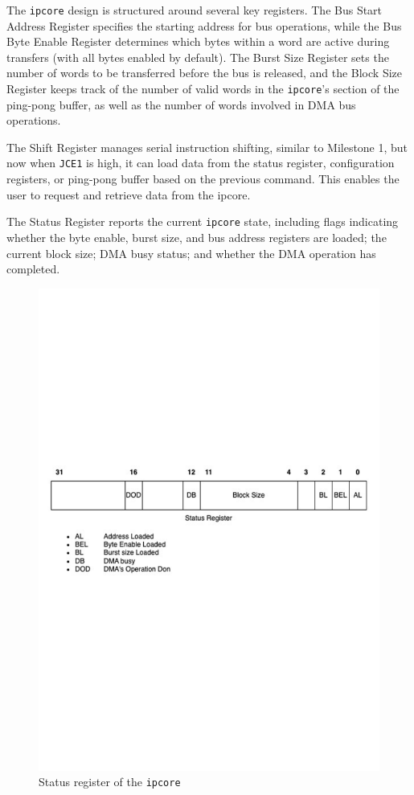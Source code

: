 \documentclass[a4paper,11pt,oneside]{report}
\begin{document}
The \texttt{ipcore} design is structured around several key registers. 
The Bus Start Address Register specifies the starting address for bus operations, 
while the Bus Byte Enable Register determines which bytes within a word are active during transfers 
(with all bytes enabled by default). 
The Burst Size Register sets the number of words to be transferred before the bus is released, 
and the Block Size Register keeps track of the number of valid words in the \texttt{ipcore}'s section of the ping-pong buffer, 
as well as the number of words involved in DMA bus operations.

The Shift Register manages serial instruction shifting, similar to Milestone 1, but now when \texttt{JCE1} is high, it can load data from the status register, configuration registers, or ping-pong buffer based on the previous command.
This enables the user to request and retrieve data from the ipcore.

The Status Register reports the current \texttt{ipcore} state, including flags indicating whether the byte enable, burst size, and bus address registers are loaded; the current block size; DMA busy status; and whether the DMA operation has completed.

\begin{figure}
    \centering
    \includegraphics[width=0.9\linewidth]{figures/status_reg.pdf}
    \caption{Status register of the \texttt{ipcore}}
    \label{fig:status_register}
\end{figure}
\end{document}
